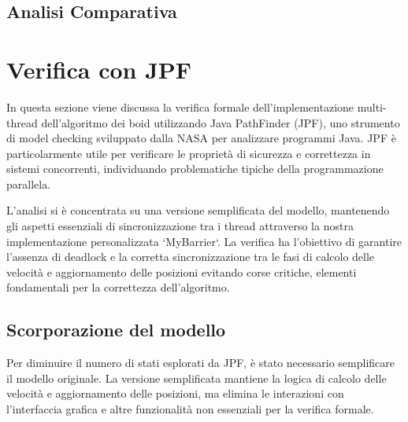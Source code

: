 \documentclass[a4paper,12pt]{report}
\begin{document}
\section{Analisi Comparativa}


\chapter{Verifica con JPF}
In questa sezione viene discussa la verifica formale dell'implementazione multi-thread dell'algoritmo dei boid utilizzando Java PathFinder (JPF), uno strumento di model checking sviluppato dalla NASA per analizzare programmi Java. 
JPF è particolarmente utile per verificare le proprietà di sicurezza e correttezza in sistemi concorrenti, individuando problematiche tipiche della programmazione parallela.

L'analisi si è concentrata su una versione semplificata del modello, mantenendo gli aspetti essenziali di sincronizzazione tra i thread attraverso la nostra implementazione personalizzata `MyBarrier`. La verifica ha l'obiettivo di garantire l'assenza di deadlock e la corretta sincronizzazione tra le fasi di calcolo delle velocità e aggiornamento delle posizioni evitando corse critiche, elementi fondamentali per la correttezza dell'algoritmo.

\section{Scorporazione del modello}
Per diminuire il numero di stati esplorati da JPF, è stato necessario semplificare il modello originale. La versione semplificata mantiene la logica di calcolo delle velocità e aggiornamento delle posizioni, ma elimina le interazioni con l'interfaccia grafica e altre funzionalità non essenziali per la verifica formale.
\end{document}
